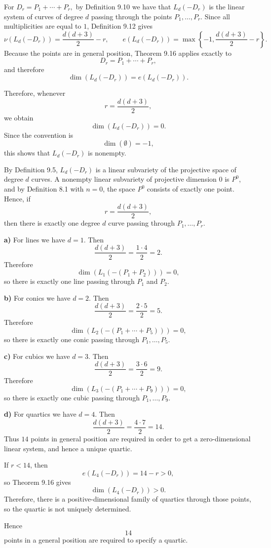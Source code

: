 \documentclass[a4paper,12pt]{article}
\theoremstyle{plain}
\theoremstyle{definition}
\theoremstyle{remark}
\begin{document}
\medskip

For
$
D_r=P_1+\cdots+P_r,$
by Definition 9.10 we have that
$
L_d(-D_r)
$
is the linear system of curves of degree $d$ passing through the points
$
P_1,\dots,P_r.
$
Since all multiplicities are equal to $1$, Definition 9.12 gives
\[
\nu(L_d(-D_r))=\frac{d(d+3)}{2}-r,
\qquad
e(L_d(-D_r))=\max\left\{-1,\frac{d(d+3)}{2}-r\right\}.
\]
Because the points are in general position, Theorem 9.16 applies exactly to
\[
D_r=P_1+\cdots+P_r,
\]
and therefore
\[
\dim(L_d(-D_r))=e(L_d(-D_r)).
\]

Therefore, whenever
\[
r=\frac{d(d+3)}{2},
\]
we obtain
\[
\dim(L_d(-D_r))=0.
\]
Since the convention is
\[
\dim(\emptyset)=-1,
\]
this shows that $L_d(-D_r)$ is nonempty.

By Definition 9.5, $L_d(-D_r)$ is a linear subvariety of the projective space of degree $d$ curves. A nonempty linear subvariety of projective dimension $0$ is $P^0$, and by Definition 8.1 with $n=0$, the space $P^0$ consists of exactly one point. Hence, if
\[
r=\frac{d(d+3)}{2},
\]
then there is exactly one degree $d$ curve passing through
$
P_1,\dots,P_r.
$

\medskip

\textbf{a)} For lines we have $d=1$. Then
\[
\frac{d(d+3)}{2}=\frac{1\cdot 4}{2}=2.
\]
Therefore
\[
\dim(L_1(-(P_1+P_2)))=0,
\]
so there is exactly one line passing through $P_1$ and $P_2$.

\medskip

\textbf{b)} For conics we have $d=2$. Then
\[
\frac{d(d+3)}{2}=\frac{2\cdot 5}{2}=5.
\]
Therefore
\[
\dim(L_2(-(P_1+\cdots+P_5)))=0,
\]
so there is exactly one conic passing through $P_1,\dots,P_5$.

\medskip

\textbf{c)} For cubics we have $d=3$. Then
\[
\frac{d(d+3)}{2}=\frac{3\cdot 6}{2}=9.
\]
Therefore
\[
\dim(L_3(-(P_1+\cdots+P_9)))=0,
\]
so there is exactly one cubic passing through $P_1,\dots,P_9$.

\medskip

\textbf{d)} For quartics we have $d=4$. Then
\[
\frac{d(d+3)}{2}=\frac{4\cdot 7}{2}=14.
\]
Thus $14$ points in general position are required in order to get a zero-dimensional linear system, and hence a unique quartic.

If $r<14$, then
\[
e(L_4(-D_r))=14-r>0,
\]
so Theorem 9.16 gives
\[
\dim(L_4(-D_r))>0.
\]
Therefore, there is a positive-dimensional family of quartics through those points, so the quartic is not uniquely determined.

Hence
\[
14
\]
points in a general position are required to specify a quartic.
\end{document}
